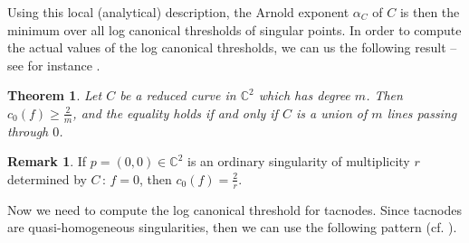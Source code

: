 \documentclass[12pt]{amsart}
\theoremstyle{plain}
\newtheorem{thm}[subsection]{Theorem}
\theoremstyle{definition}
\newtheorem{rk}[subsection]{Remark}
\numberwithin{equation}{section}
\begin{document}
Using this local (analytical) description, the Arnold exponent $\alpha_{C}$ of $C$ is then the minimum over all log canonical thresholds of singular points. 
In order to compute the actual values of the log canonical thresholds, we can us the following result -- see for instance \cite[Theorem 4.1]{Cheltsov}. 
\begin{thm}
Let $C$ be a reduced curve in $\mathbb{C}^{2}$ which has degree $m$. Then $c_{0}(f) \geq \frac{2}{m}$, and the equality holds if and only if $C$ is a union of $m$ lines passing through $0$.
\end{thm}
\begin{rk}
If $p=(0,0) \in \mathbb{C}^{2}$ is an ordinary singularity of multiplicity $r$ determined by $C \, : \, f=0$, then $c_{0}(f) = \frac{2}{r}$.
\end{rk}

Now we need to compute the log canonical threshold for tacnodes. Since tacnodes are quasi-homogeneous singularities, then we can use the following pattern (cf. \cite[Formula 2.1]{DimcaSernesi}).
\end{document}
